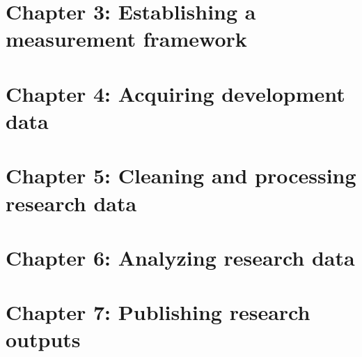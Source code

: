 \chapter{Chapter 3: Establishing a measurement framework}
\label{ch:3}






\chapter{Chapter 4: Acquiring development data}
\label{ch:4}






\chapter{Chapter 5: Cleaning and processing research data}
\label{ch:5}




\chapter{Chapter 6: Analyzing research data}
\label{ch:6}




\chapter{Chapter 7: Publishing research outputs}
\label{ch:7}

